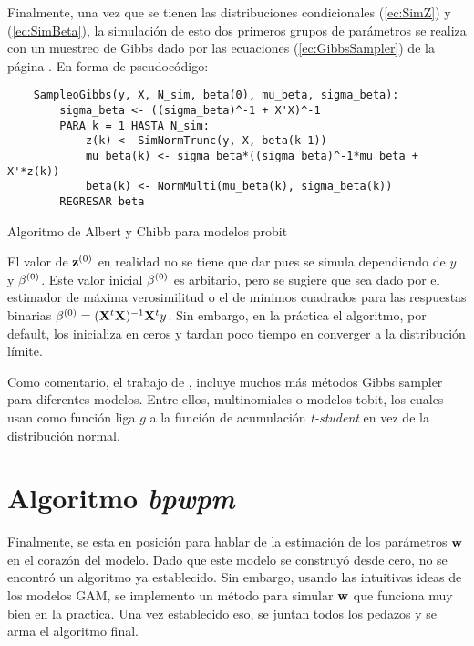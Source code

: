 \documentclass[../Main/Main.tex]{subfiles}
\begin{document}
Finalmente, una vez que se tienen las distribuciones condicionales (\ref{ec:SimZ}) y (\ref{ec:SimBeta}), la simulación de esto dos primeros grupos de parámetros se realiza con un muestreo de Gibbs dado por las ecuaciones (\ref{ec:GibbsSampler}) de la página \pageref{ec:GibbsSampler}. En forma de pseudocódigo:\\
\begin{table}
\makebox[\linewidth]{\rule{\textwidth}{0.4pt}}
\begin{verbatim} 
    SampleoGibbs(y, X, N_sim, beta(0), mu_beta, sigma_beta):
        sigma_beta <- ((sigma_beta)^-1 + X'X)^-1
        PARA k = 1 HASTA N_sim:
            z(k) <- SimNormTrunc(y, X, beta(k-1))
            mu_beta(k) <- sigma_beta*((sigma_beta)^-1*mu_beta + X'*z(k))
            beta(k) <- NormMulti(mu_beta(k), sigma_beta(k)) 
        REGRESAR beta
\end{verbatim}
\makebox[\linewidth]{\rule{\textwidth}{0.4pt}}
\label{alg:SimZBeta}
\caption{Algoritmo de Albert y Chibb para modelos probit}
\end{table}
El valor de $\mathbf{z}^{(0)}$ en realidad no se tiene que dar pues se simula dependiendo de $y$ y $\beta^{(0)}$. Este valor inicial $\beta^{(0)}$ es arbitario, pero se sugiere que sea dado por el estimador de máxima verosimilitud o el de mínimos cuadrados para las respuestas binarias $\beta^{(0)} = (\mathbf{X}^t\mathbf{X})^{-1}\mathbf{X}^ty$. Sin embargo, en la práctica el algoritmo, por default, los inicializa en ceros y tardan poco tiempo en converger a la distribución límite.

Como comentario, el trabajo de \autocite{albert1993bayesian}, incluye muchos más métodos Gibbs sampler para diferentes modelos. Entre ellos, multinomiales o modelos tobit, los cuales usan como función liga $g$ a la función de acumulación \textit{t-student} en vez de la distribución normal.   

\section{Algoritmo \textit{bpwpm}}
Finalmente, se esta en posición para hablar de la estimación de los parámetros $\mathbf{w}$ en el corazón del modelo. Dado que este modelo se construyó desde cero, no se encontró un algoritmo ya establecido. Sin embargo, usando las intuitivas ideas de los modelos GAM, se implemento un método para simular $\mathbf{w}$ que funciona muy bien en la practica. Una vez establecido eso, se juntan todos los pedazos y se arma el algoritmo final. 
\end{document}
